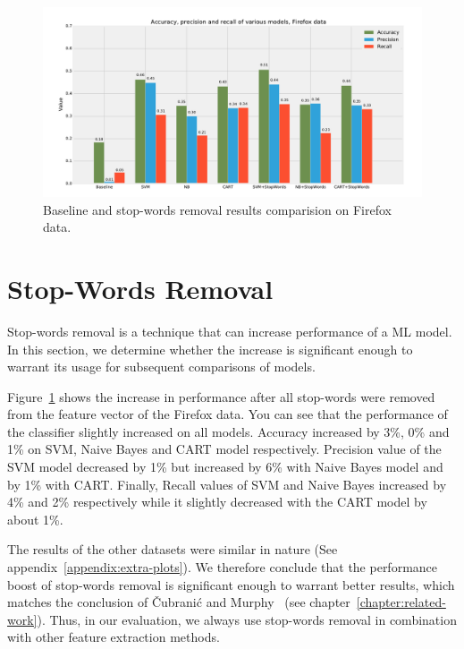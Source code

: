 \begin{figure}[htbp]
    \centering
        \includegraphics[width=\textwidth]{./images/comparison_of_models/firefox_0.pdf}
    \caption{Baseline and stop-words removal results comparision on Firefox data.}
    \label{fig:models.firefox.stopwords}
\end{figure}

\section{Stop-Words Removal}

Stop-words removal is a technique that can increase performance of a ML model. In this section, we determine whether the increase is significant enough to warrant its usage for subsequent comparisons of models.

Figure~\ref{fig:models.firefox.stopwords} shows the increase in performance after all stop-words were removed from the feature vector of the Firefox data. You can see that the performance of the classifier slightly increased on all models. Accuracy increased by 3\%, 0\% and 1\% on SVM, Naive Bayes and CART model respectively. Precision value of the SVM model decreased by 1\% but increased by 6\% with Naive Bayes model and by 1\% with CART. Finally, Recall values of SVM and Naive Bayes increased by 4\% and 2\% respectively while it slightly decreased with the CART model by about 1\%.

The results of the other datasets were similar in nature (See appendix~\ref{appendix:extra-plots}). We therefore conclude that the performance boost of stop-words removal is significant enough to warrant better results, which matches the conclusion of Čubranić and Murphy~\cite{Murphy} (see chapter~\ref{chapter:related-work}). Thus, in our evaluation, we always use stop-words removal in combination with other feature extraction methods.

